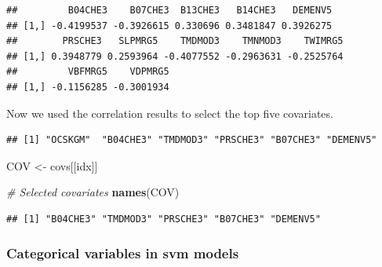 \documentclass[10pt,b5paper,]{book}
\newenvironment{Shaded}{\begin{snugshade}}{\end{snugshade}}
\newcommand{\CommentTok}[1]{\textcolor[rgb]{0.56,0.35,0.01}{\textit{#1}}}
\newcommand{\DecValTok}[1]{\textcolor[rgb]{0.00,0.00,0.81}{#1}}
\newcommand{\KeywordTok}[1]{\textcolor[rgb]{0.13,0.29,0.53}{\textbf{#1}}}
\newcommand{\NormalTok}[1]{#1}
\newcommand{\OperatorTok}[1]{\textcolor[rgb]{0.81,0.36,0.00}{\textbf{#1}}}
\newcommand{\OtherTok}[1]{\textcolor[rgb]{0.56,0.35,0.01}{#1}}
\newcommand{\StringTok}[1]{\textcolor[rgb]{0.31,0.60,0.02}{#1}}
\theoremstyle{definition}
\theoremstyle{definition}
\theoremstyle{definition}
\theoremstyle{remark}
\begin{document}
\begin{verbatim}
##         B04CHE3    B07CHE3  B13CHE3   B14CHE3   DEMENV5
## [1,] -0.4199537 -0.3926615 0.330696 0.3481847 0.3926275
##        PRSCHE3   SLPMRG5    TMDMOD3    TMNMOD3    TWIMRG5
## [1,] 0.3948779 0.2593964 -0.4077552 -0.2963631 -0.2525764
##         VBFMRG5    VDPMRG5
## [1,] -0.1156285 -0.3001934
\end{verbatim}

Now we used the correlation results to select the top five covariates.

\begin{Shaded}
\end{Shaded}

\begin{verbatim}
## [1] "OCSKGM"  "B04CHE3" "TMDMOD3" "PRSCHE3" "B07CHE3" "DEMENV5"
\end{verbatim}

\begin{Shaded}
\begin{Highlighting}[]
\NormalTok{COV <-}\StringTok{ }\NormalTok{covs[[idx]]}

\CommentTok{# Selected covariates}
\KeywordTok{names}\NormalTok{(COV)}
\end{Highlighting}
\end{Shaded}

\begin{verbatim}
## [1] "B04CHE3" "TMDMOD3" "PRSCHE3" "B07CHE3" "DEMENV5"
\end{verbatim}

\hypertarget{categorical-variables-in-svm-models}{%
\subsubsection{Categorical variables in svm
models}\label{categorical-variables-in-svm-models}}
\end{document}
